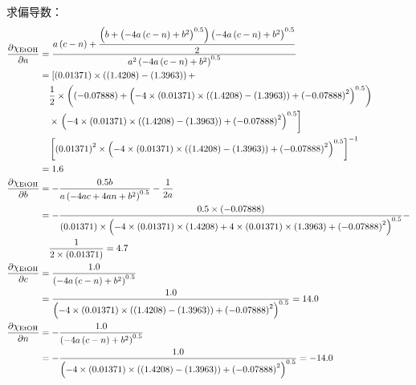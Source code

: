求偏导数：
\begin{equation*}
\begin{aligned}
\frac{\partial \chi_{\rm{EtOH}} }{\partial a }&=\frac{a \left(c - n\right) + \dfrac{\left(b + \left(- 4 a \left(c - n\right) + b^{2}\right)^{0.5}\right) \left(- 4 a \left(c - n\right) + b^{2}\right)^{0.5}}{2}}{a^{2} \left(- 4 a \left(c - n\right) + b^{2}\right)^{0.5}}\\
&=\left[\left(0.01371\right) \times \left(\left(1.4208\right) - \left(1.3963\right)\right) + \right.\\
&\quad\frac{1}{2}\times\left(\left(-0.07888\right) + \left(- 4 \times \left(0.01371\right) \times \left(\left(1.4208\right) - \left(1.3963\right)\right) + \left(-0.07888\right)^{2}\right)^{0.5}\right) \\
&\quad\times\left. \left(- 4 \times \left(0.01371\right) \times \left(\left(1.4208\right) - \left(1.3963\right)\right) + \left(-0.07888\right)^{2}\right)^{0.5}\right]\\
&\quad\left[{\left(0.01371\right)^{2} \times \left(- 4 \times \left(0.01371\right) \times \left(\left(1.4208\right) - \left(1.3963\right)\right) + \left(-0.07888\right)^{2}\right)^{0.5}}\right]^{-1}\\
&=1.6\\ 
\frac{\partial \chi_{\rm{EtOH}} }{\partial b }&=- \frac{0.5 b}{a \left(- 4 a c + 4 a n + b^{2}\right)^{0.5}} - \frac{1}{2 a}\\
&=- \frac{0.5 \times \left(-0.07888\right)}{\left(0.01371\right) \times \left(- 4 \times \left(0.01371\right) \times \left(1.4208\right) + 4 \times \left(0.01371\right) \times \left(1.3963\right) + \left(-0.07888\right)^{2}\right)^{0.5}} -\\
&\quad\frac{1}{2 \times \left(0.01371\right)}=4.7\\
\frac{\partial \chi_{\rm{EtOH}} }{\partial c }
&=\frac{1.0}{\left(- 4 a \left(c - n\right) + b^{2}\right)^{0.5}}\\
&=\frac{1.0}{\left(- 4 \times \left(0.01371\right) \times \left(\left(1.4208\right) - \left(1.3963\right)\right) + \left(-0.07888\right)^{2}\right)^{0.5}}=14.0\\
\frac{\partial \chi_{\rm{EtOH}} }{\partial n }&=- \frac{1.0}{\left(- 4 a \left(c - n\right) + b^{2}\right)^{0.5}}\\
&=- \frac{1.0}{\left(- 4 \times \left(0.01371\right) \times \left(\left(1.4208\right) - \left(1.3963\right)\right) + \left(-0.07888\right)^{2}\right)^{0.5}}=-14.0\\
\end{aligned}
\end{equation*}

